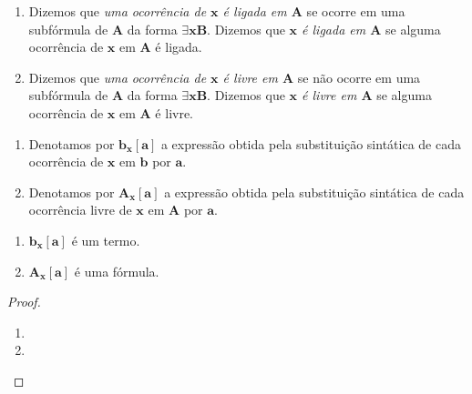 \begin{definition}
    \leavevmode
        \begin{enumerate}[leftmargin=*, align=left, label=\textbf{(\alph*)}]
            \item Dizemos que \emph{uma ocorrência de $\mathbf{x}$ é ligada em $\mathbf{A}$} se ocorre em uma subfórmula de $\mathbf{A}$ da forma $\exists \mathbf{x} \mathbf{B}$. Dizemos que \emph{$\mathbf{x}$ é ligada em $\mathbf{A}$} se alguma ocorrência de $\mathbf{x}$ em $\mathbf{A}$ é ligada.
            \item Dizemos que \emph{uma ocorrência de $\mathbf{x}$ é livre em $\mathbf{A}$} se não ocorre em uma subfórmula de $\mathbf{A}$ da forma $\exists \mathbf{x} \mathbf{B}$. Dizemos que \emph{$\mathbf{x}$ é livre em $\mathbf{A}$} se alguma ocorrência de $\mathbf{x}$ em $\mathbf{A}$ é livre.
        \end{enumerate}
\end{definition}

\begin{definition}
    \leavevmode
        \begin{enumerate}[leftmargin=*, align=left, label=\textbf{(\alph*)}]
            \item Denotamos por $\mathbf{b}_{\mathbf{x}}[\mathbf{a}]$ a expressão obtida pela substituição sintática de cada ocorrência de $\mathbf{x}$ em $\mathbf{b}$ por $\mathbf{a}$.
            \item Denotamos por $\mathbf{A}_{\mathbf{x}}[\mathbf{a}]$ a expressão obtida pela substituição sintática de cada ocorrência livre de $\mathbf{x}$ em $\mathbf{A}$ por $\mathbf{a}$.
        \end{enumerate}
\end{definition}

\begin{proposition}
    \leavevmode
        \begin{enumerate}[leftmargin=*, align=left, label=\textbf{(\alph*)}]
            \item $\mathbf{b}_{\mathbf{x}}[\mathbf{a}]$ é um termo.
            \item $\mathbf{A}_{\mathbf{x}}[\mathbf{a}]$ é uma fórmula.
        \end{enumerate}
\end{proposition}

\begin{proof}
    \leavevmode
        \begin{enumerate}[leftmargin=*, align=left, label=\textbf{(\alph*)}]
            \item \blackproof
            \item \blackproof
        \end{enumerate}
\end{proof}

